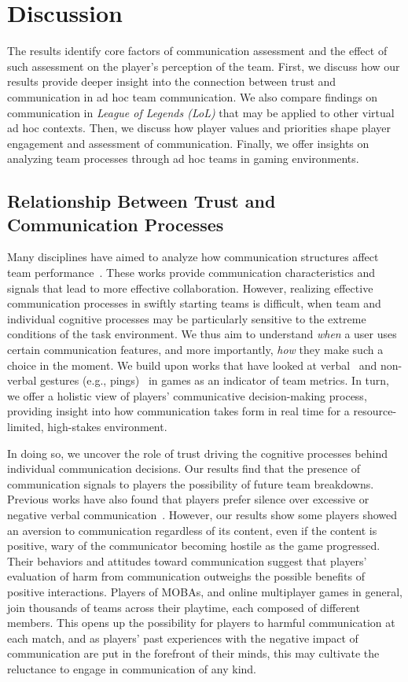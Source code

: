 \section{Discussion} \label{discussion}
The results identify core factors of communication assessment and the effect of such assessment on the player's perception of the team. First, we discuss how our results provide deeper insight into the connection between trust and communication in ad hoc team communication. We also compare findings on communication in \textit{League of Legends (LoL)} that may be applied to other virtual ad hoc contexts. Then, we discuss how player values and priorities shape player engagement and assessment of communication. Finally, we offer insights on analyzing team processes through ad hoc teams in gaming environments.


\subsection{Relationship Between Trust and Communication Processes}

Many disciplines have aimed to analyze how communication structures affect team performance~\cite{chalupnik2020, finholt1990, roberts2014, capiola2020}. These works provide communication characteristics and signals that lead to more effective collaboration. However, realizing effective communication processes in swiftly starting teams is difficult, when team and individual cognitive processes may be particularly sensitive to the extreme conditions of the task environment. We thus aim to understand \textit{when} a user uses certain communication features, and more importantly, \textit{how} they make such a choice in the moment. We build upon works that have looked at verbal~\cite{tan2022, tan2021less} and non-verbal gestures (e.g., pings)~\cite{leavitt2016} in games as an indicator of team metrics. In turn, we offer a holistic view of players' communicative decision-making process, providing insight into how communication takes form in real time for a resource-limited, high-stakes environment.

In doing so, we uncover the role of trust driving the cognitive processes behind individual communication decisions. Our results find that the presence of communication signals to players the possibility of future team breakdowns. Previous works have also found that players prefer silence over excessive or negative verbal communication~\cite{buchan2016, tan2021less}. However, our results show some players showed an aversion to communication regardless of its content, even if the content is positive, wary of the communicator becoming hostile as the game progressed. Their behaviors and attitudes toward communication suggest that players' evaluation of harm from communication outweighs the possible benefits of positive interactions. Players of MOBAs, and online multiplayer games in general, join thousands of teams across their playtime, each composed of different members. This opens up the possibility for players to harmful communication at each match, and as players' past experiences with the negative impact of communication are put in the forefront of their minds, this may cultivate the reluctance to engage in communication of any kind.

